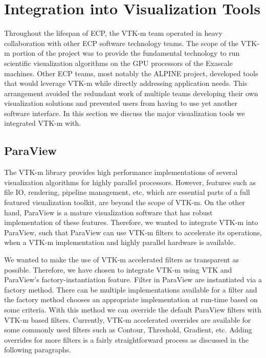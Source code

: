 \section{Integration into Visualization Tools}

Throughout the lifespan of ECP, the VTK-m team operated in heavy collaboration with other ECP software technology teams.
The scope of the VTK-m portion of the project was to provide the fundamental technology to run scientific visualization algorithms on the GPU processors of the Exascale machines.
Other ECP teams, most notably the ALPINE project, developed tools that would leverage VTK-m while directly addressing application needs.
This arrangement avoided the redundant work of multiple teams developing their own visualization solutions and prevented users from having to use yet another software interface.
In this section we discuss the major visualization tools we integrated VTK-m with.


\subsection{ParaView}

The VTK-m library provides high performance implementations of several visualization algorithms for highly parallel processors. However, features such as file IO, rendering, pipeline management, etc, which are essential parts of a full featured visualization toolkit, are beyond the scope of VTK-m. On the other hand, ParaView is a mature visualization software that has robust implementation of these features. Therefore, we wanted to integrate VTK-m into ParaView, such that ParaView can use VTK-m filters to accelerate its operations, when a VTK-m implementation and highly parallel hardware is available.

We wanted to make the use of VTK-m accelerated filters as transparent as possible. Therefore, we have chosen to integrate VTK-m using VTK and ParaView’s factory-instantiation feature. Filter in ParaView are instantiated via a factory method. There can be multiple implementations available for a filter and the factory method chooses an appropriate implementation at run-time based on some criteria. With this method we can override the default ParaView filters with VTK-m based filters. Currently, VTK-m accelerated overrides are available for some commonly used filters such as Contour, Threshold, Gradient, etc. Adding overrides for more filters is a fairly straightforward process as discussed in the following paragraphs.

